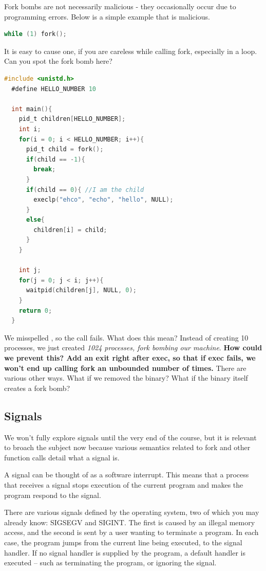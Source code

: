 \begin{itemize}
Fork bombs are not necessarily malicious - they occasionally occur due to programming errors.
Below is a simple example that is malicious.

\begin{lstlisting}[language=C]
  while (1) fork();
\end{lstlisting}

It is easy to cause one, if you are careless while calling fork, especially in a loop.
Can you spot the fork bomb here?

\begin{lstlisting}[language=C]
  #include <unistd.h>
  #define HELLO_NUMBER 10

  int main(){
    pid_t children[HELLO_NUMBER];
    int i;
    for(i = 0; i < HELLO_NUMBER; i++){
      pid_t child = fork();
      if(child == -1){
        break;
      }
      if(child == 0){ //I am the child
        execlp("ehco", "echo", "hello", NULL);
      }
      else{
        children[i] = child;
      }
    }

    int j;
    for(j = 0; j < i; j++){
      waitpid(children[j], NULL, 0);
    }
    return 0;
  }
\end{lstlisting}

We misspelled , so the  call fails.
What does this mean? Instead of creating 10 processes, we just created \emph{1024 processes, fork bombing our machine}. \textbf{How could we prevent this? Add an exit right after exec, so that if exec fails, we won't end up calling fork an unbounded number of times.}
There are various other ways. What if we removed the  binary? What if the binary itself creates a fork bomb?

\subsection{Signals}

We won't fully explore signals until the very end of the course, but it is relevant to broach the subject now because various semantics related to fork and other function calls detail what a signal is.

A signal can be thought of as a software interrupt. This means that a process that receives a signal stops execution of the current program and makes the program respond to the signal.

There are various signals defined by the operating system, two of which you may already know: SIGSEGV and SIGINT. The first is caused by an illegal memory access, and the second is sent by a user wanting to terminate a program. In each case, the program jumps from the current line being executed, to the signal handler. If no signal handler is supplied by the program, a default handler is executed -- such as terminating the program, or ignoring the signal.


\end{itemize}
